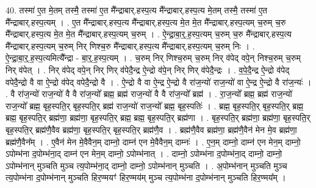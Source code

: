 \documentclass[17pt]{extarticle}
\begin{document}
40. तस्मा॑ ए॒त मे॒तम् तस्मै॒ तस्मा॑ ए॒त मै᳚न्द्राबार्.हस्प॒त्य मै᳚न्द्राबार्.हस्प॒त्य मे॒तम् तस्मै॒ तस्मा॑ ए॒त मै᳚न्द्राबार्.हस्प॒त्यम् । . ए॒त मै᳚न्द्राबार्.हस्प॒त्य मै᳚न्द्राबार्.हस्प॒त्य मे॒त मे॒त मै᳚न्द्राबार्.हस्प॒त्यम् च॒रुम् च॒रु मै᳚न्द्राबार्.हस्प॒त्य मे॒त मे॒त मै᳚न्द्राबार्.हस्प॒त्यम् च॒रुम् । . ऐ॒न्द्रा॒बा॒र्॒.ह॒स्प॒त्यम् च॒रुम् च॒रु मै᳚न्द्राबार्.हस्प॒त्य मै᳚न्द्राबार्.हस्प॒त्यम् च॒रुम् निर् णिश्च॒रु मै᳚न्द्राबार्.हस्प॒त्य मै᳚न्द्राबार्.हस्प॒त्यम् च॒रुम् निः । . ऐ॒न्द्रा॒बा॒र्॒.ह॒स्प॒त्यमित्यै᳚न्द्रा - बा॒र्॒.ह॒स्प॒त्यम् । . च॒रुम् निर् णिश्च॒रुम् च॒रुम् निर् व॑पेद् वपे॒न् निश्च॒रुम् च॒रुम् निर् व॑पेत् । . निर् व॑पेद् वपे॒न् निर् णिर् व॑पेदै॒न्द्र ऐ॒न्द्रो व॑पे॒न् निर् णिर् व॑पेदै॒न्द्रः । . व॒पे॒दै॒न्द्र ऐ॒न्द्रो व॑पेद् वपेदै॒न्द्रो वै वा ऐ॒न्द्रो व॑पेद् वपेदै॒न्द्रो वै । . ऐ॒न्द्रो वै वा ऐ॒न्द्र ऐ॒न्द्रो वै रा॑ज॒न्यो॑ राज॒न्यो॑ वा ऐ॒न्द्र ऐ॒न्द्रो वै रा॑ज॒न्यः॑ । . वै रा॑ज॒न्यो॑ राज॒न्यो॑ वै वै रा॑ज॒न्यो᳚ ब्रह्म॒ ब्रह्म॑ राज॒न्यो॑ वै वै रा॑ज॒न्यो᳚ ब्रह्म॑ । . रा॒ज॒न्यो᳚ ब्रह्म॒ ब्रह्म॑ राज॒न्यो॑ राज॒न्यो᳚ ब्रह्म॒ बृह॒स्पति॒र् बृह॒स्पति॒र् ब्रह्म॑ राज॒न्यो॑ राज॒न्यो᳚ ब्रह्म॒ बृह॒स्पतिः॑ । . ब्रह्म॒ बृह॒स्पति॒र् बृह॒स्पति॒र् ब्रह्म॒ ब्रह्म॒ बृह॒स्पति॒र् ब्रह्म॑णा॒ ब्रह्म॑णा॒ बृह॒स्पति॒र् ब्रह्म॒ ब्रह्म॒ बृह॒स्पति॒र् ब्रह्म॑णा । . बृह॒स्पति॒र् ब्रह्म॑णा॒ ब्रह्म॑णा॒ बृह॒स्पति॒र् बृह॒स्पति॒र् ब्रह्म॑णै॒वैव ब्रह्म॑णा॒ बृह॒स्पति॒र् बृह॒स्पति॒र् ब्रह्म॑णै॒व । . ब्रह्म॑णै॒वैव ब्रह्म॑णा॒ ब्रह्म॑णै॒वैन॑ मेन मे॒व ब्रह्म॑णा॒ ब्रह्म॑णै॒वैन᳚म् । . ए॒वैन॑ मेन मे॒वैवैन॒म् दाम्नो॒ दाम्न॑ एन मे॒वैवैन॒म् दाम्नः॑ । . ए॒न॒म् दाम्नो॒ दाम्न॑ एन मेन॒म् दाम्नो॒ ऽपोम्भ॑ना द॒पोम्भ॑ना॒द् दाम्न॑ एन मेन॒म् दाम्नो॒ ऽपोम्भ॑नात् । . दाम्नो॒ ऽपोम्भ॑ना द॒पोम्भ॑ना॒द् दाम्नो॒ दाम्नो॒ ऽपोम्भ॑नान् मुञ्चति मुञ्च त्य॒पोम्भ॑ना॒द् दाम्नो॒ दाम्नो॒ ऽपोम्भ॑नान् मुञ्चति । . अ॒पोम्भ॑नान् मुञ्चति मुञ्च त्य॒पोम्भ॑ना द॒पोम्भ॑नान् मुञ्चति हिर॒ण्मयꣳ॑ हिर॒ण्मय॑म् मुञ्च त्य॒पोम्भ॑ना द॒पोम्भ॑नान् मुञ्चति हिर॒ण्मय᳚म् । \newline
\end{document}
